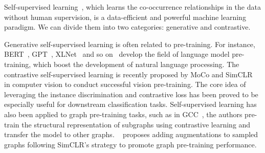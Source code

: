 Self-supervised learning~\cite{liu2020self}, which learns the co-occurrence relationships in the data without human supervision, is a data-efficient and powerful machine learning paradigm. We can divide them into two categories: generative and contrastive.

Generative self-supervised learning is often related to pre-training. For instance, BERT~\cite{devlin2018bert}, GPT~\cite{radford2019language}, XLNet~\cite{yang2019xlnet} and so on~\cite{raffel2020exploring,du2021all} develop the field of language model pre-training, which boost the development of natural language processing. The contrastive self-supervised learning is recently proposed by MoCo and SimCLR~\cite{he2020momentum,chen2020simple} in computer vision to conduct successful vision pre-training. The core idea of leveraging the instance discrimination and contrastive loss has been proved to be especially useful for downstream
classification tasks.
Self-supervised learning has also been applied to graph pre-training tasks, such as in GCC~\cite{qiu2020gcc}, the authors pre-train the structural representation of subgraphs using contrastive learning and transfer the model to other graphs. ~\cite{you2020graph} proposes adding augmentations to sampled graphs following SimCLR's strategy to promote graph pre-training performance.





